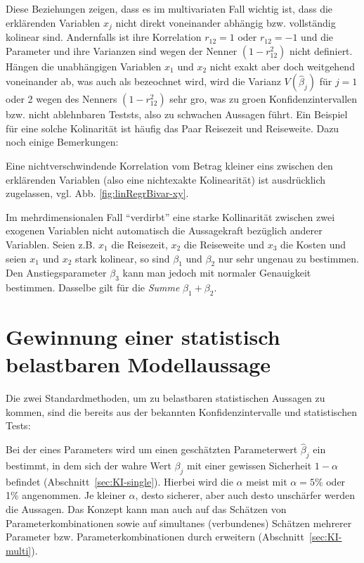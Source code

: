 Diese Beziehungen zeigen, dass es im multivariaten Fall wichtig ist,
dass die 
erkl\"arenden Variablen $x_j$ nicht  direkt voneinander abh\"angig
bzw. vollst\"andig kolinear sind. Andernfalls ist ihre Korrelation $r_{12}=1$ oder $r_{12}=-1$ und die Parameter
und ihre Varianzen 
 sind wegen der Nenner $(1-r^2_{12})$ nicht definiert. H\"angen die
unabh\"angigen Variablen $x_1$ und $x_2$ nicht exakt aber doch
weitgehend voneinander ab, was auch als 
bezeochnet wird, wird die Varianz 
$V (\hat{\beta}_j)$ f\"ur $j=1$ oder 2 wegen des Nenners $(1-r^2_{12})$ 
sehr gro\3, was zu gro\3en
Konfidenzintervallen bzw. nicht ablehnbaren Teststs, also zu schwachen
Aussagen f\"uhrt. Ein Beispiel f\"ur eine solche Kolinarit\"at ist
h\"aufig das
Paar Reisezeit und Reiseweite. Dazu noch einige Bemerkungen:

\bi 
\item Eine 
nichtverschwindende Korrelation vom Betrag kleiner eins zwischen den
erkl\"arenden Variablen  (also eine nichtexakte Kolinearit\"at)
ist ausdr\"ucklich zugelassen, vgl. Abb. \ref{fig:linRegrBivar-xy}. 
\item Im mehrdimensionalen Fall ``verdirbt'' eine starke
Kollinarit\"at zwischen zwei exogenen Variablen nicht automatisch die
Aussagekraft bez\"uglich anderer Variablen. Seien z.B. $x_1$ die
Reisezeit, $x_2$ die Reiseweite und $x_3$ die Kosten und seien $x_1$
und $x_2$ stark kolinear, so sind $\beta_1$ und $\beta_2$ nur sehr
ungenau zu bestimmen. Den Anstiegsparameter $\beta_3$ kann man jedoch
mit normaler 
Genauigkeit bestimmen. Dasselbe gilt f\"ur die \textit{Summe}
$\beta_1+\beta_2$.
\ei



\section{\label{sec:KI-tests}Gewinnung einer statistisch belastbaren Modellaussage}

Die zwei Standardmethoden, um zu belastbaren statistischen Aussagen
zu kommen, sind die bereits aus  der
  bekannten Konfidenzintervalle und statistischen Tests:

\bi
\item Bei der  eines Parameters wird um einen gesch\"atzten
Parameterwert $\hat{\beta}_j$ ein  bestimmt, 
in dem sich der wahre Wert $\beta_j$
mit einer gewissen Sicherheit $1-\alpha$ befindet
(Abschnitt~\ref{sec:KI-single}). Hierbei wird die 
 $\alpha$ meist mit $\alpha=5\%$ oder
1\% angenommen. Je kleiner $\alpha$, desto sicherer, aber auch desto
unsch\"arfer werden die Aussagen. Das Konzept kann man auch auf das
Sch\"atzen von Parameterkombinationen sowie auf simultanes (verbundenes)
 Sch\"atzen mehrerer Parameter bzw. Parameterkombinationen 
durch  
erweitern (Abschnitt~\ref{sec:KI-multi}).

